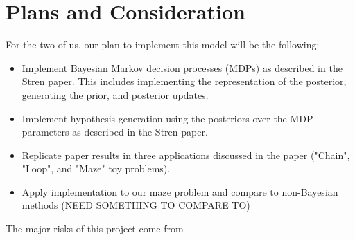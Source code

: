 \documentclass[11pt, twoside]{article}
\begin{document}
\section{Plans and Consideration}

For the two of us, our plan to implement this model will be the following:

\begin{itemize}
\item Implement Bayesian Markov decision processes (MDPs) as described in the Stren paper. This includes implementing the representation of the posterior, generating the prior, and posterior updates.
\item Implement hypothesis generation using the posteriors over the MDP parameters as described in the Stren paper.
\item Replicate paper results in three applications discussed in the paper ("Chain", "Loop", and "Maze" toy problems).
\item Apply implementation to our maze problem and compare to non-Bayesian methods (NEED SOMETHING TO COMPARE TO)

\end{itemize}


The major risks of this project come from



\end{document}
